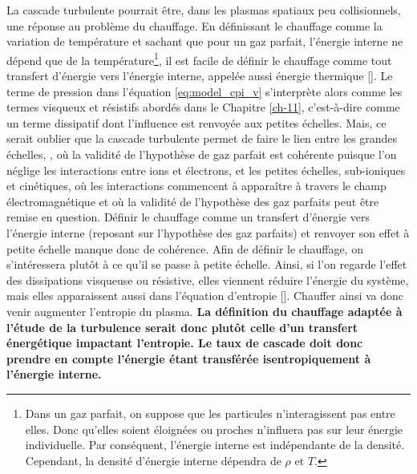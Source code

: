 La cascade turbulente pourrait être, dans les plasmas spatiaux peu collisionnels, une réponse au problème du chauffage. En définissant le chauffage comme la variation de température et sachant que pour un gaz parfait, l'énergie interne ne dépend que de la température\footnote{Dans un gaz parfait, on suppose que les particules n'interagissent pas entre elles. Donc qu'elles soient éloignées ou proches n'influera pas sur leur énergie individuelle. Par conséquent, l'énergie interne est indépendante de la densité. Cependant, la densité d'énergie interne dépendra de $\rho$ et $T$.}, il est facile de définir le chauffage comme tout transfert d'énergie vers l'énergie interne, appelée aussi énergie thermique [\cite{cassak_pressure-strain_2022}]. Le terme de pression dans l'équation \eqref{eq:model_cpi_v} s'interprète alors comme les termes visqueux et résistifs abordés dans le Chapitre \ref{ch-11}, c'est-à-dire comme un terme \og dissipatif\fg{} dont l'influence est renvoyée aux petites échelles. Mais, ce serait oublier que la cascade turbulente permet de faire le lien entre les grandes échelles, , où la validité de l'hypothèse de gaz parfait est cohérente puisque l'on néglige les interactions entre ions et électrons, et les petites échelles, sub-ioniques et cinétiques, où les interactions commencent à apparaître à travers le champ électromagnétique et où la validité de l'hypothèse des gaz parfaits peut être remise en question. Définir le chauffage comme un transfert d'énergie vers l'énergie interne (reposant sur l'hypothèse des gaz parfaits) et renvoyer son effet à petite échelle manque donc de cohérence. Afin de définir le chauffage, on s'intéressera plutôt à ce qu'il se passe à petite échelle. Ainsi, si l'on regarde l'effet des dissipations visqueuse ou résistive, elles viennent réduire l'énergie du système, mais elles apparaissent aussi dans l'équation d'entropie [\cite{eyink_cascades_2018}]. Chauffer ainsi va donc venir augmenter l'entropie du plasma. {\bf La définition du chauffage adaptée à l'étude de la turbulence serait donc plutôt celle d'un transfert énergétique impactant l'entropie. Le taux de cascade doit donc prendre en compte l'énergie étant transférée isentropiquement à l'énergie interne.}

